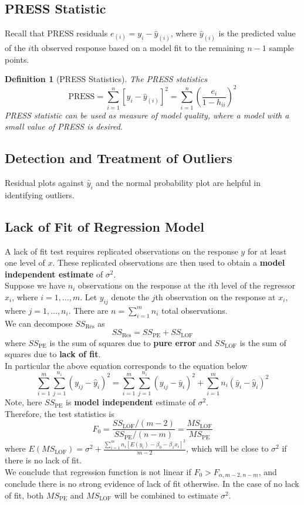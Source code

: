 \documentclass[11pt]{article}
\newtheorem{definition}{Definition}[section]
\theoremstyle{definition}
\begin{document}
\subsection{PRESS Statistic}
Recall that PRESS residuals $e_{(i)}=y_i-\hat{y}_{(i)}$, where $\hat{y}_{(i)}$ is the predicted value of the $i$th observed response based on a model fit to the remaining $n-1$ sample points.
\begin{definition}[PRESS Statistics]
\normalfont The PRESS statistics
\[
\text{PRESS}=\sum_{i=1}^n [y_i-\hat{y}_{(i)}]^2 = \sum_{i=1}^n (\frac{e_i}{1-h_{ii}})^2
\]
PRESS statistic can be used as measure of model quality, where a model with a small value of PRESS is desired.
\end{definition}
\subsection{Detection and Treatment of Outliers}
Residual plots against $\hat{y}_i$ and the normal probability plot are helpful in identifying outliers.
\subsection{Lack of Fit of Regression Model}
A lack of fit test requires replicated observations on the response $y$ for at least one level of $x$. These replicated observations are then used to obtain a \textbf{model independent estimate} of $\sigma^2$.\\
Suppose we have $n_i$ observations on the response at the $i$th level of the regressor $x_i$, where $i=1,\ldots, m$. Let $y_{ij}$ denote the $j$th observation on the response at $x_i$, where $j=1,\ldots, n_i$. There are $n=\sum_{i=1}^m n_i$ total observations.\\
We can decompose $SS_\text{Res}$ as 
\[
SS_\text{Res} = SS_\text{PE}+SS_\text{LOF}
\]
where $SS_\text{PE}$ is the sum of squares due to \textbf{pure error} and $SS_\text{LOF}$ is the sum of squares due to \textbf{lack of fit}.\\
In particular the above equation corresponds to the equation below
\[
\sum_{i=1}^m \sum_{j=1}^{n_i} (y_{ij}-\hat{y}_i)^2 = \sum_{i=1}^m \sum_{j=1}^{n_i}(y_{ij}-\bar{y}_i)^2+\sum_{i=1}^m n_i(\bar{y}_i-\hat{y}_i)^2
\]
Note, here $SS_\text{PE}$ is \textbf{model independent} estimate of $\sigma^2$.\\
Therefore, the test statistics is
\[
F_0=\frac{SS_\text{LOF}/(m-2)}{SS_\text{PE}/(n-m)}=\frac{MS_\text{LOF}}{MS_\text{PE}}
\]
where $E(MS_\text{LOF})=\sigma^2+\frac{\sum_{i=1}^m n_i[E(y_i)-\beta_0-\beta_1x_i]^2}{m-2}$, which will be close to $\sigma^2$ if there is no lack of fit.\\
We conclude that regression function is not linear if $F_0>F_{\alpha, m-2, n-m}$, and conclude there is no strong evidence of lack of fit otherwise. In the case of no lack of fit, both $MS_\text{PE}$ and $MS_\text{LOF}$ will be combined to estimate $\sigma^2$.
\end{document}
